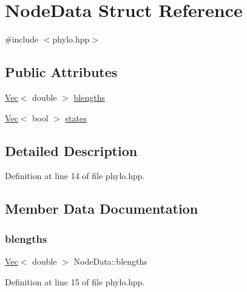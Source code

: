 \hypertarget{struct_node_data}{}\section{Node\+Data Struct Reference}
\label{struct_node_data}


{\ttfamily \#include $<$phylo.\+hpp$>$}

\subsection*{Public Attributes}
\begin{DoxyCompactItemize}
\item 
\hyperlink{phylo_8hpp_a7966e901999842222671212316797352}{Vec}$<$ double $>$ \hyperlink{struct_node_data_a383b410d83ee12eef28330cd10b3e349}{blengths}
\item 
\hyperlink{phylo_8hpp_a7966e901999842222671212316797352}{Vec}$<$ bool $>$ \hyperlink{struct_node_data_a4eca9b107effe3e95eecfac6a47b7353}{states}
\end{DoxyCompactItemize}


\subsection{Detailed Description}


Definition at line 14 of file phylo.\+hpp.



\subsection{Member Data Documentation}
\mbox{\label{struct_node_data_a383b410d83ee12eef28330cd10b3e349}} 
\subsubsection{\texorpdfstring{blengths}{blengths}}
{\footnotesize\ttfamily \hyperlink{phylo_8hpp_a7966e901999842222671212316797352}{Vec}$<$ double $>$ Node\+Data\+::blengths}



Definition at line 15 of file phylo.\+hpp.

\mbox{\label{struct_node_data_a4eca9b107effe3e95eecfac6a47b7353}} 
